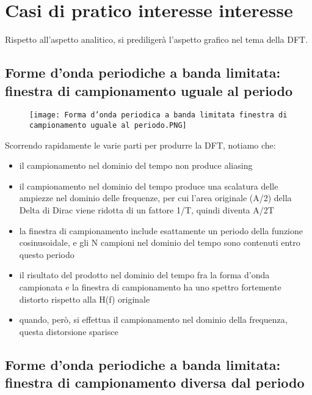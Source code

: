 \newpage 

\section{Casi di pratico interesse interesse}

Rispetto all'aspetto analitico, si prediligerà l'aspetto grafico nel tema della DFT. \newline 

\newpage

\subsection{Forme d'onda periodiche a banda limitata: finestra di campionamento uguale al periodo}

\begin{figure}[h]
    \centering
    \texttt{[image: Forma d'onda periodica a banda limitata finestra di campionamento uguale al periodo.PNG]}
\end{figure} 

Scorrendo rapidamente le varie parti per produrre la DFT, notiamo che: 

\begin{itemize}
    \item il campionamento nel dominio del tempo non produce aliasing 
    \item il campionamento nel dominio del tempo produce una scalatura delle ampiezze nel dominio delle frequenze, per cui l'area originale (A/2) della Delta di Dirac viene ridotta di un fattore 1/T, quindi diventa A/2T 
    \item la finestra di campionamento include esattamente un periodo della funzione cosinusoidale, e gli N campioni nel dominio del tempo sono contenuti entro questo periodo 
    \item il risultato del prodotto nel dominio del tempo fra la forma d'onda campionata e la finestra di campionamento ha uno spettro fortemente distorto rispetto alla H(f) originale 
    \item quando, però, si effettua il campionamento nel dominio della frequenza, questa distorsione sparisce
\end{itemize}

\newpage 

\subsection{Forme d'onda periodiche a banda limitata: finestra di campionamento diversa dal periodo}
